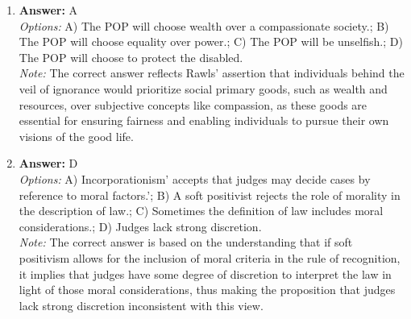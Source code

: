 \documentclass[12pt]{article}
\begin{document}
\begin{enumerate}[label=\arabic*.]
\item \textbf{Answer:} A
\\ \textit{Options:} A) The POP will choose wealth over a compassionate society.; B) The POP will choose equality over power.; C) The POP will be unselfish.; D) The POP will choose to protect the disabled.
\\ \textit{Note:} The correct answer reflects Rawls' assertion that individuals behind the veil of ignorance would prioritize social primary goods, such as wealth and resources, over subjective concepts like compassion, as these goods are essential for ensuring fairness and enabling individuals to pursue their own visions of the good life.
\item \textbf{Answer:} D
\\ \textit{Options:} A) Incorporationism' accepts that judges may decide cases by reference to moral factors.'; B) A soft positivist rejects the role of morality in the description of law.; C) Sometimes the definition of law includes moral considerations.; D) Judges lack strong discretion.
\\ \textit{Note:} The correct answer is based on the understanding that if soft positivism allows for the inclusion of moral criteria in the rule of recognition, it implies that judges have some degree of discretion to interpret the law in light of those moral considerations, thus making the proposition that judges lack strong discretion inconsistent with this view.
\end{enumerate}
\end{document}
